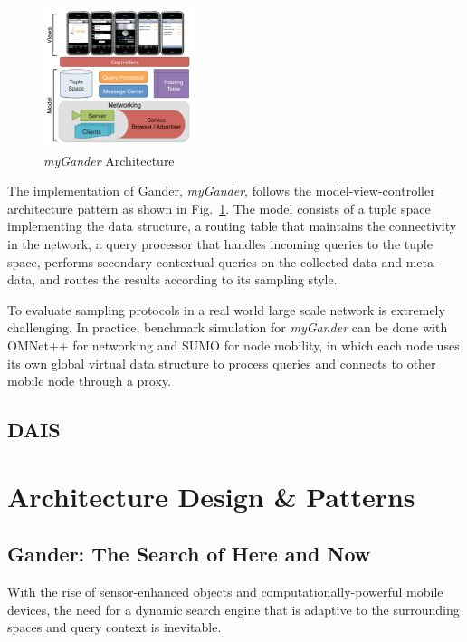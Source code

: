 \documentclass[11pt,onecolumn]{article}
\begin{document}
\begin{figure}
\vspace{-20pt}
  \begin{center}
    \includegraphics[width=0.4\textwidth]{resources/gander_architecture.png}
  \end{center}
  \vspace{-20pt}
  \caption{{\em myGander} Architecture \cite{michel2013gander} \label{gander_architecture}}
    \vspace{-20pt}
\end{figure}

The implementation of Gander, {\em myGander}\cite{michel2012mygander}, follows the model-view-controller architecture pattern as shown in Fig.~\ref{gander_architecture}. The model consists of a tuple space implementing the data structure, a routing table that maintains the connectivity in the network, a query processor that handles incoming queries to the tuple space, performs secondary contextual queries on the collected data and meta-data, and routes the results according to its sampling style.

To evaluate sampling protocols in a real world large scale network is extremely challenging. In practice, benchmark simulation for {\em myGander} can be done with OMNet++\cite{varga2001omnet++} for networking and SUMO\cite{krajzewicz2002sumo} for node mobility, in which each node uses its own global virtual data structure to process queries and connects to other mobile node through a proxy.

\subsection{DAIS}

\section{Architecture Design \& Patterns}

\subsection{Gander: The Search of Here and Now}
With the rise of sensor-enhanced objects and computationally-powerful mobile devices, the need for a dynamic search engine that is adaptive to the surrounding spaces and query context is inevitable. 
\end{document}
